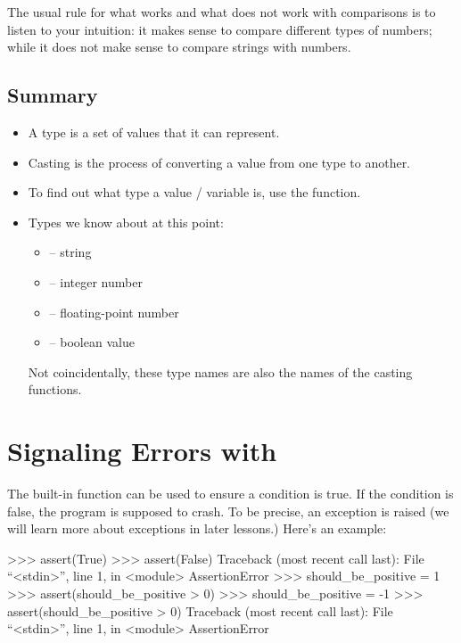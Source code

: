 \documentclass[11pt]{cselabheader}
\begin{document}
The usual rule for what works and what does not work with comparisons is to
listen to your intuition: it makes sense to compare different types of numbers;
while it does not make sense to compare strings with numbers.

\subsection{Summary}

\begin{itemize}
  \item A type is a set of values that it can represent.
  \item Casting is the process of converting a value from one type to another.
  \item To find out what type a value / variable is, use the
     function.
  \item Types we know about at this point:
    \begin{multicols}{2}
      \begin{itemize}
        \item {} -- string
        \item {} -- integer number
        \item {} -- floating-point number
        \item {} -- boolean value
      \end{itemize}
    \end{multicols}
    Not coincidentally, these type names are also the names of the casting
    functions.
\end{itemize}

\pagebreak
\section{Signaling Errors with \protect{}}
The built-in function  can be used to ensure a
condition is true.
If the condition is false, the program is supposed to crash.
To be precise, an  exception is raised
(we will learn more about exceptions in later lessons.)
Here's an example:
\begin{pyconcode}
>>> assert(True)
>>> assert(False)
Traceback (most recent call last):
  File ``<stdin>'', line 1, in <module>
AssertionError
>>> should_be_positive = 1
>>> assert(should_be_positive > 0)
>>> should_be_positive = -1
>>> assert(should_be_positive > 0)
Traceback (most recent call last):
  File ``<stdin>'', line 1, in <module>
AssertionError
\end{pyconcode}
\end{document}
